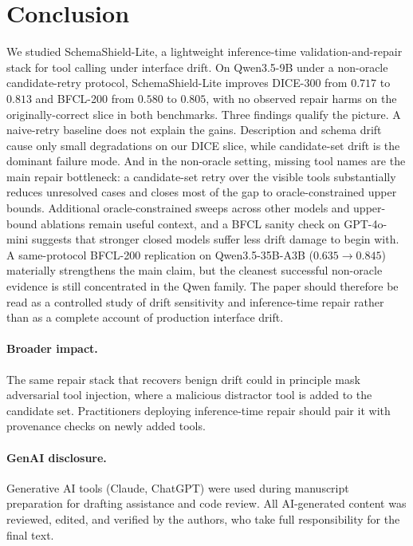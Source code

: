 \documentclass{svproc}
\newcommand{\method}{SchemaShield-Lite\xspace}
\begin{document}
\section{Conclusion}
We studied \method, a lightweight inference-time validation-and-repair stack for
tool calling under interface drift. On Qwen3.5-9B under a non-oracle candidate-retry protocol,
\method improves DICE-300 from $0.717$ to $0.813$ and BFCL-200 from $0.580$ to
$0.805$, with no observed repair harms on the originally-correct slice in both
benchmarks. Three findings qualify the picture. A naive-retry baseline does not
explain the gains. Description and schema drift cause only small degradations on
our DICE slice, while candidate-set drift is the dominant failure mode. And in the
non-oracle setting, missing tool names are the main repair bottleneck: a
candidate-set retry over the visible tools substantially reduces unresolved cases
and closes most of the gap to oracle-constrained upper bounds. Additional
oracle-constrained sweeps across other models and upper-bound ablations remain
useful context, and a BFCL sanity check on GPT-4o-mini suggests that stronger
closed models suffer less drift damage to begin with. A same-protocol BFCL-200
replication on Qwen3.5-35B-A3B ($0.635 \rightarrow 0.845$) materially strengthens
the main claim, but the cleanest successful non-oracle evidence is still
concentrated in the Qwen family. The paper should therefore be read as a
controlled study of drift sensitivity and inference-time repair rather than as a
complete account of production interface drift.

\paragraph{Broader impact.}
The same repair stack that recovers benign drift could in principle mask adversarial
tool injection, where a malicious distractor tool is added to the candidate set.
Practitioners deploying inference-time repair should pair it with provenance checks
on newly added tools.

\paragraph{GenAI disclosure.}
Generative AI tools (Claude, ChatGPT) were used during manuscript preparation for
drafting assistance and code review. All AI-generated content was reviewed, edited,
and verified by the authors, who take full responsibility for the final text.



\end{document}
